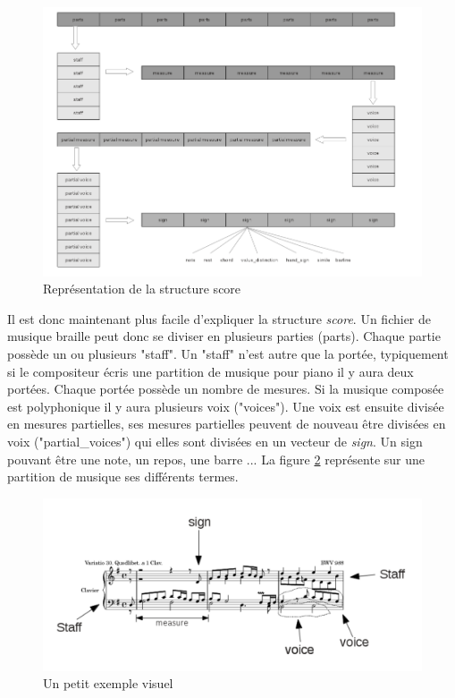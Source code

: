 \begin{figure}[h]
  \centering
  \includegraphics[width=1\textwidth]{images/bmc-score.png}
  \caption{Représentation de la structure score}
  \label{score}
\end{figure}

Il est donc maintenant plus facile d'expliquer la structure
\textit{score}. Un fichier de musique braille peut donc se diviser en
plusieurs parties (parts). Chaque partie possède un ou plusieurs
"staff". Un "staff" n'est autre que la portée, typiquement si le
compositeur écris une partition de musique pour piano il y aura deux
portées. Chaque portée possède un nombre de mesures. Si la musique
composée est polyphonique il y aura plusieurs voix ("voices"). Une
voix est ensuite divisée en mesures partielles, ses mesures partielles
peuvent de nouveau être divisées en voix ("partial\_voices") qui elles
sont divisées en un vecteur de \textit{sign}. Un sign pouvant être une
note, un repos, une barre ... La figure \ref{musicexe} représente sur
une partition de musique ses différents termes.


\begin{figure}[!h]
  \includegraphics[width=1\textwidth]{images/score-visu.png}
  \caption{Un petit exemple visuel}
  \label{musicexe}
\end{figure}

